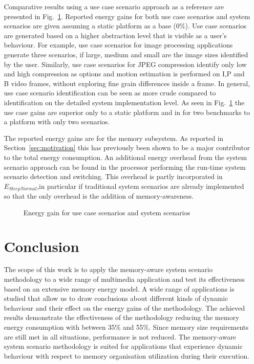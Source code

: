 \documentclass{acm_proc_article-sp}
\begin{document}
Comparative results using a use case scenario approach as a reference are presented in Fig.~\ref{fig:usecase}. Reported energy gains for both use case scenarios and system scenarios are given assuming a static platform as a base (0\%). Use case scenarios are generated based on a higher abstraction level that is visible as a user's behaviour. For example, use case scenarios for image processing applications generate three scenarios, if large, medium and small are the image sizes identified by the user. Similarly, use case scenarios for JPEG compression identify only low and high compression as options and motion estimation is performed on I,P and B video frames, without exploring fine grain differences inside a frame. In general, use case scenario identification can be seen as more crude compared to identification on the detailed system implementation level. As seen in Fig.~\ref{fig:usecase} the use case gains are superior only to a static platform and in for two benchmarks to a platform with only two scenarios.  

The reported energy gains are for the memory subsystem. As reported in Section~\ref{sec:motivation} this has previously been shown to be a major contributor to the total energy consumption. An additional energy overhead from the system scenario approach can be found in the processor performing the run-time system scenario detection and switching. This overhead is partly incorporated in $E_{SleepNormal}$,in particular if traditional system scenarios are already implemented so that the only overhead is the addition of memory-awareness.

\begin{figure}[!t]
\centering
\caption{Energy gain for use case scenarios and system scenarios}
\label{fig:usecase}
\end{figure}

\section{Conclusion}
\label{sec:conclusion}

The scope of this work is to apply the memory-aware system scenario methodology to a wide range of multimedia application and test its effectiveness based on an extensive memory energy model. A wide range of applications is studied that allow us to draw conclusions about different kinds of dynamic behaviour and their effect on the energy gains of the methodology. The achieved results demonstrate the effectiveness of the methodology reducing the memory energy consumption with between 35\% and 55\%. Since memory size requirements are still met in all situations, performance is not reduced. The memory-aware system scenario methodology is suited for applications that experience dynamic behaviour with respect to memory organisation utilization during their execution.


%


\balancecolumns
\end{document}
